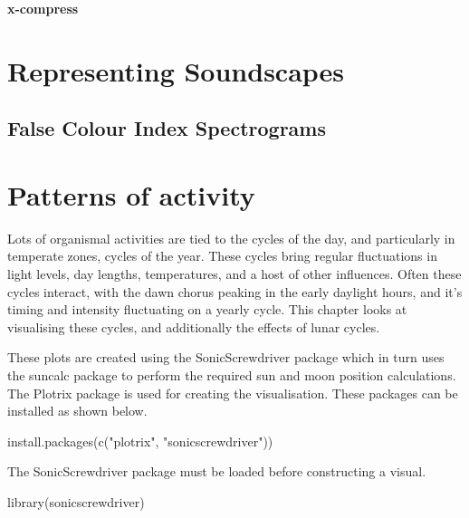 \documentclass[
]{book}
\newenvironment{Shaded}{\begin{snugshade}}{\end{snugshade}}
\newcommand{\FunctionTok}[1]{\textcolor[rgb]{0.00,0.00,0.00}{#1}}
\newcommand{\NormalTok}[1]{#1}
\newcommand{\StringTok}[1]{\textcolor[rgb]{0.31,0.60,0.02}{#1}}
\begin{document}
\textbf{x-compress}

\hypertarget{representing-soundscapes}{%
\chapter{Representing Soundscapes}\label{representing-soundscapes}}

\hypertarget{false-colour-index-spectrograms}{%
\section{False Colour Index Spectrograms}\label{false-colour-index-spectrograms}}

\hypertarget{patterns-of-activity}{%
\chapter{Patterns of activity}\label{patterns-of-activity}}

Lots of organismal activities are tied to the cycles of the day, and particularly in temperate zones, cycles of the year. These cycles bring regular fluctuations in light levels, day lengths, temperatures, and a host of other influences. Often these cycles interact, with the dawn chorus peaking in the early daylight hours, and it's timing and intensity fluctuating on a yearly cycle. This chapter looks at visualising these cycles, and additionally the effects of lunar cycles.

These plots are created using the SonicScrewdriver package \citep{sonicscrewdriver} which in turn uses the suncalc package \citep{suncalc} to perform the required sun and moon position calculations. The Plotrix package \citep{plotrix} is used for creating the visualisation. These packages can be installed as shown below.

\begin{Shaded}
\begin{Highlighting}[]
\FunctionTok{install.packages}\NormalTok{(}\FunctionTok{c}\NormalTok{(}\StringTok{"plotrix"}\NormalTok{, }\StringTok{"sonicscrewdriver"}\NormalTok{))}
\end{Highlighting}
\end{Shaded}

The SonicScrewdriver package must be loaded before constructing a visual.

\begin{Shaded}
\begin{Highlighting}[]
\FunctionTok{library}\NormalTok{(sonicscrewdriver)}
\end{Highlighting}
\end{Shaded}
\end{document}
